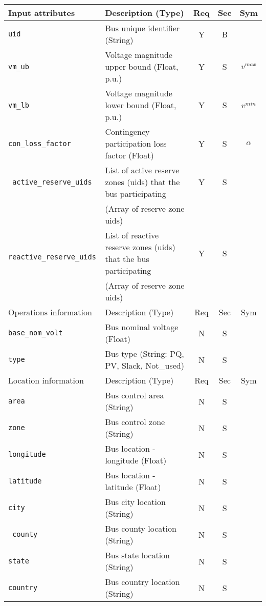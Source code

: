 \documentclass{article}
\begin{document}
\begin{center}
\small
\begin{tabular}{ l | l | c | c | c |}
Input attributes & Description (Type) & Req & Sec & Sym\\
\hline
  {\tt uid} & Bus unique identifier (String)& Y & B &  \\
  {\tt vm\_ub} & Voltage magnitude upper bound (Float, p.u.)& Y & S & $v^{max}$\\
  {\tt vm\_lb} & Voltage magnitude lower bound (Float, p.u.)& Y & S & $v^{min}$\\
  {\tt con\_loss\_factor} & Contingency participation loss factor (Float) & Y & S & $\alpha$\\
  {\tt\color{red} active\_reserve\_uids} & List of active reserve zones (uids) that the bus participating & Y & S & \\ 
                     &  (Array of reserve zone uids) &  & & \\ 
  {\tt\color{red} reactive\_reserve\_uids} & List of reactive reserve zones (uids) that the bus participating & Y & S & \\ 
                     &  (Array of reserve zone uids) &  & & \\                      
  \hline
  Operations information & Description (Type) & Req & Sec & Sym\\
  \hline
  {\tt base\_nom\_volt} & Bus nominal voltage (Float) & N & S & \\
  {\tt type} & Bus type (String: PQ, PV, Slack, Not\_used) & N & S &\\  
  \hline
  Location information & Description (Type) & Req & Sec & Sym\\
  \hline
  {\tt area} &  Bus control area (String)& N & S & \\
  {\tt zone} &  Bus control zone (String)& N & S & \\ 
  {\tt longitude} & Bus location - longitude (Float) & N & S & \\
  {\tt latitude} & Bus location - latitude (Float) & N & S & \\
  {\tt city}     & Bus city location (String) & N & S & \\
  {\tt\color{red} county}     & Bus county location (String) & N & S & \\
  {\tt state}    & Bus state location (String) & N & S & \\
  {\tt country}  & Bus country location (String) & N & S & \\
  \hline  
\end{tabular}
\end{center}
\end{document}
